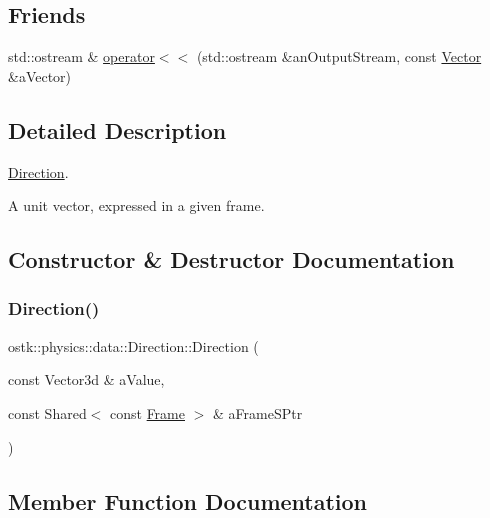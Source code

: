\subsection*{Friends}
\begin{DoxyCompactItemize}
\item 
std\+::ostream \& \hyperlink{classostk_1_1physics_1_1data_1_1_direction_a2f1253dbad20965d2209456421eabf71}{operator$<$$<$} (std\+::ostream \&an\+Output\+Stream, const \hyperlink{classostk_1_1physics_1_1data_1_1_vector}{Vector} \&a\+Vector)
\end{DoxyCompactItemize}


\subsection{Detailed Description}
\hyperlink{classostk_1_1physics_1_1data_1_1_direction}{Direction}. 

A unit vector, expressed in a given frame. 

\subsection{Constructor \& Destructor Documentation}
\mbox{\label{classostk_1_1physics_1_1data_1_1_direction_ac247d7c6d290db488940c0100b5cda5d}} 
\subsubsection{\texorpdfstring{Direction()}{Direction()}}
{\footnotesize\ttfamily ostk\+::physics\+::data\+::\+Direction\+::\+Direction (\begin{DoxyParamCaption}\item[{const Vector3d \&}]{a\+Value,  }\item[{const Shared$<$ const \hyperlink{classostk_1_1physics_1_1coord_1_1_frame}{Frame} $>$ \&}]{a\+Frame\+S\+Ptr }\end{DoxyParamCaption})}



\subsection{Member Function Documentation}
\mbox{\label{classostk_1_1physics_1_1data_1_1_direction_a90bf1d390562e9b3a8115af07b6b4e6b}} 
